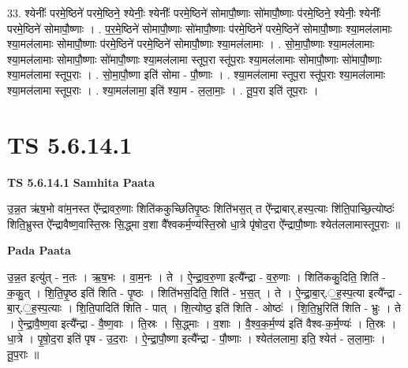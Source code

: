 \documentclass[17pt]{extarticle}
\begin{document}
33. श्येनीः᳚ परमे॒ष्ठिने॑ परमे॒ष्ठिने॒ श्येनीः॒ श्येनीः᳚ परमे॒ष्ठिने॑ सोमापौ॒ष्णाः सो॑मापौ॒ष्णाः प॑रमे॒ष्ठिने॒ श्येनीः॒ श्येनीः᳚ परमे॒ष्ठिने॑ सोमापौ॒ष्णाः । . प॒र॒मे॒ष्ठिने॑ सोमापौ॒ष्णाः सो॑मापौ॒ष्णाः प॑रमे॒ष्ठिने॑ परमे॒ष्ठिने॑ सोमापौ॒ष्णाः श्या॒मल॑लामाः श्या॒मल॑लामाः सोमापौ॒ष्णाः प॑रमे॒ष्ठिने॑ परमे॒ष्ठिने॑ सोमापौ॒ष्णाः श्या॒मल॑लामाः । . सो॒मा॒पौ॒ष्णाः श्या॒मल॑लामाः श्या॒मल॑लामाः सोमापौ॒ष्णाः सो॑मापौ॒ष्णाः श्या॒मल॑लामा स्तूप॒रा स्तू॑प॒राः श्या॒मल॑लामाः सोमापौ॒ष्णाः सो॑मापौ॒ष्णाः श्या॒मल॑लामा स्तूप॒राः । . सो॒मा॒पौ॒ष्णा इति॑ सोमा - पौ॒ष्णाः । . श्या॒मल॑लामा स्तूप॒रा स्तू॑प॒राः श्या॒मल॑लामाः श्या॒मल॑लामा स्तूप॒राः । . श्या॒मल॑लामा॒ इति॑ श्या॒म - ल॒ला॒माः॒ । . तू॒प॒रा इति॑ तूप॒राः । \newline
\pagebreak
{}

\section{ TS 5.6.14.1 }

\textbf{TS 5.6.14.1 } \newline
\textbf{Samhita Paata} \newline

उ॒न्न॒त ऋ॑ष॒भो वा॑म॒नस्त ऐ᳚न्द्रावरु॒णाः शिति॑ककुच्छितिपृ॒ष्ठः शिति॑भस॒त् त ऐ᳚न्द्राबार्.हस्प॒त्याः शि॑ति॒पाच्छि॒त्योष्ठः॑ शिति॒भ्रुस्त ऐ᳚न्द्रावैष्ण॒वास्ति॒स्रः सि॒द्ध्मा व॒शा वै᳚श्वकर्म॒ण्य॑स्ति॒स्रो धा॒त्रे पृ॑षोद॒रा ऐ᳚न्द्रापौ॒ष्णाः श्येत॑ललामास्तूप॒राः ॥ \newline

\textbf{Pada Paata} \newline

उ॒न्न॒त इत्यु॑त् - न॒तः । ऋ॒ष॒भः । वा॒म॒नः । ते । ऐ॒न्द्रा॒व॒रु॒णा इत्यै᳚न्द्रा - व॒रु॒णाः । शिति॑ककु॒दिति॒ शिति॑ - क॒कु॒त् । शि॒ति॒पृ॒ष्ठ इति॑ शिति - पृ॒ष्ठः । शिति॑भस॒दिति॒ शिति॑ - भ॒स॒त् । ते । ऐ॒न्द्रा॒बा॒र्.॒ह॒स्प॒त्या इत्यै᳚न्द्रा - बा॒र्.॒ह॒स्प॒त्याः । शि॒ति॒पादिति॑ शिति - पात् । शि॒त्योष्ठ॒ इति॑ शिति - ओष्ठः॑ । शि॒ति॒भ्रुरिति॑ शिति - भ्रुः । ते । ऐ॒न्द्रा॒वै॒ष्ण॒वा इत्यै᳚न्द्रा - वै॒ष्ण॒वाः । ति॒स्रः । सि॒द्ध्माः । व॒शाः । वै॒श्व॒क॒र्म॒ण्य॑ इति॑ वैश्व-क॒र्म॒ण्यः॑ । ति॒स्रः । धा॒त्रे । पृ॒षो॒द॒रा इति॑ पृष - उ॒द॒राः । ऐ॒न्द्रा॒पौ॒ष्णा इत्यै᳚न्द्रा - पौ॒ष्णाः । श्येत॑ललामा॒ इति॒ श्येत॑ - ल॒ला॒माः॒ । तू॒प॒राः ॥  \newline
\end{document}
